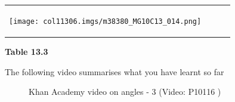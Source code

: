 \begin{table}[H]
\begin{center}
\begin{xtabular*}{\mytablewidth}[t]{|p{3cm}|p{3cm}|p{3cm}|p{20\mystarwidth}|}
    
        
                  
    \setcounter{subfigure}{0}

\label{m38380*id317099}
    \begin{center}
    \label{m38380*id317099!!!underscore!!!media}\label{m38380*id317099!!!underscore!!!printimage}\texttt{[image: col11306.imgs/m38380\_MG10C13\_014.png]} %
        
      \vspace{2pt}
    \vspace{.1in}
    
    \end{center}



    \addtocounter{footnote}{-0}
    
     \tabularnewline{}
    \end{xtabular*}
      \end{center}
    \begin{center}{\small\bfseries Table 13.3}\end{center}
    
    \addtocounter{footnote}{-0}
    
    \par
  
\label{m38380*eip-918}The following video summarises what you have learnt so far


    \setcounter{subfigure}{0}


	\begin{figure}[H] %
    
    
    \textnormal{Khan Academy video on angles - 3}\vspace{.1in} \nopagebreak
  \label{m38380*yt-media3}\label{m38380*yt-video3}
             { (Video:  P10116 )}
      

\end{figure}
\end{table}
